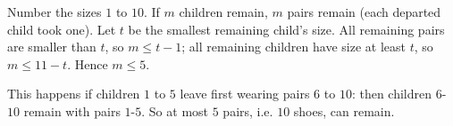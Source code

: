 Number the sizes $1$ to $10$. If $m$ children remain, $m$ pairs remain (each departed child took one). Let $t$ be the smallest remaining child's size. All remaining pairs are smaller than $t$, so $m\le t-1$; all remaining children have size at least $t$, so $m\le11-t$. Hence $m\le5$.

This happens if children $1$ to $5$ leave first wearing pairs $6$ to $10$: then children $6$-$10$ remain with pairs $1$-$5$. So at most $\boxed{5}$ pairs, i.e. $10$ shoes, can remain.
